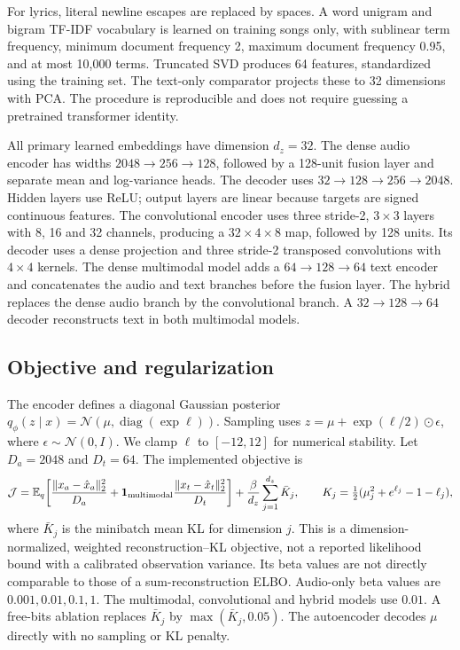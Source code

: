 \documentclass{article}
\begin{document}
For lyrics, literal newline escapes are replaced by spaces. A word unigram and
bigram TF-IDF vocabulary is learned on training songs only, with sublinear term
frequency, minimum document frequency 2, maximum document frequency 0.95, and at
most 10,000 terms. Truncated SVD produces 64 features, standardized using the
training set. The text-only comparator projects these to 32 dimensions with
PCA. The procedure is reproducible and does not require guessing a pretrained
transformer identity.

All primary learned embeddings have dimension $d_z=32$. The dense audio encoder
has widths $2048\rightarrow256\rightarrow128$, followed by a 128-unit fusion
layer and separate mean and log-variance heads. The decoder uses
$32\rightarrow128\rightarrow256\rightarrow2048$. Hidden layers use ReLU;
output layers are linear because targets are signed continuous features.
The convolutional encoder uses three stride-2, $3\times3$ layers with 8, 16 and
32 channels, producing a $32\times4\times8$ map, followed by 128 units. Its
decoder uses a dense projection and three stride-2 transposed convolutions with
$4\times4$ kernels. The dense multimodal model adds a
$64\rightarrow128\rightarrow64$ text encoder and concatenates the audio and
text branches before the fusion layer. The hybrid replaces the dense audio
branch by the convolutional branch. A $32\rightarrow128\rightarrow64$ decoder
reconstructs text in both multimodal models.

\subsection{Objective and regularization}
The encoder defines a diagonal Gaussian posterior
$q_\phi(z\mid x)=\mathcal N(\mu,\operatorname{diag}(\exp\ell))$.
Sampling uses $z=\mu+\exp(\ell/2)\odot\epsilon$, where
$\epsilon\sim\mathcal N(0,I)$. We clamp $\ell$ to $[-12,12]$ for numerical
stability. Let $D_a=2048$ and $D_t=64$. The implemented objective is
\begin{equation}
\label{eq:loss}
\mathcal J =
 \mathbb E_{q}\!\left[\frac{\lVert x_a-\hat x_a\rVert_2^2}{D_a}
 +\mathbf1_{\rm multimodal}\frac{\lVert x_t-\hat x_t\rVert_2^2}{D_t}\right]
 +\frac{\beta}{d_z}\sum_{j=1}^{d_z}\bar K_j,
\qquad
K_j=\tfrac12(\mu_j^2+e^{\ell_j}-1-\ell_j),
\end{equation}
where $\bar K_j$ is the minibatch mean KL for dimension $j$.
This is a dimension-normalized, weighted reconstruction--KL objective, not a
reported likelihood bound with a calibrated observation variance. Its beta
values are not directly comparable to those of a sum-reconstruction ELBO.
Audio-only beta values are $0.001,0.01,0.1,1$. The multimodal, convolutional and
hybrid models use $0.01$. A free-bits ablation replaces
$\bar K_j$ by $\max(\bar K_j,0.05)$. The autoencoder decodes $\mu$ directly with
no sampling or KL penalty.
\end{document}
